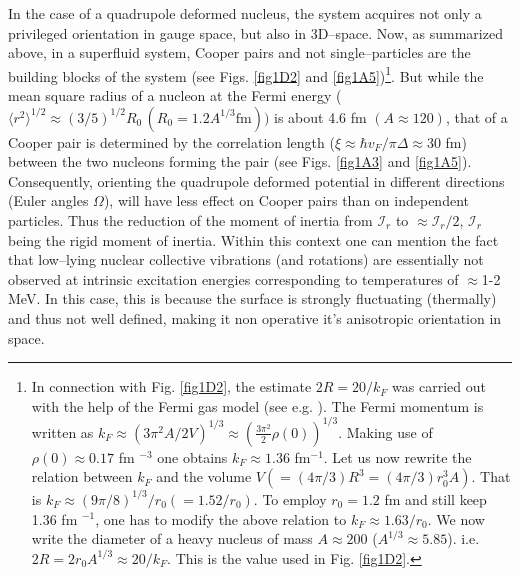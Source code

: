 In the case of a quadrupole deformed nucleus, the system acquires not only a privileged orientation in gauge space, but also in 3D--space. Now, as summarized above, in a superfluid system, Cooper pairs and not single--particles are the building blocks of the system (see Figs. \ref{fig1D2} and \ref{fig1A5})\footnote{In connection with Fig. \ref{fig1D2}, the estimate $2R=20/k_F$ was carried out with the help of the Fermi gas model (see e.g. \cite{Bohr:69}). The Fermi momentum is written as $k_F\approx (3\pi^2 A/2V)^{1/3}\approx (\frac{3\pi^2}{2}\rho(0))^{1/3}$. Making use of $\rho(0)\approx 0.17$ fm $^{-3}$ one obtains $k_F\approx 1.36 $ fm$^{-1}$. Let us now rewrite the relation between $k_F$ and the volume $V(=(4\pi/3) R^3=(4\pi/3) r_0^3 A)$. That is $k_F\approx (9\pi/8)^{1/3}/r_0(=1.52/r_0)$. To employ $r_0=1.2$ fm and still keep 1.36 fm $^{-1}$, one has to modify the above relation to $k_F\approx 1.63/r_0$. We now write the diameter of a heavy nucleus of mass $A\approx 200$ ($A^{1/3}\approx 5.85$). i.e. $2R=2r_0A^{1/3}\approx 20/k_F$.
 This is the value used in Fig. \ref{fig1D2}.}. But while the mean square radius of a nucleon at the Fermi energy ($\langle r^2\rangle^{1/2}\approx (3/5)^{1/2}R_0 \,(R_0=1.2 A^{1/3}\text{fm}))$ is about 4.6 fm $(A\approx 120)$, that of a Cooper pair is determined by the correlation length ($\xi\approx\hbar v_F/\pi\Delta\approx 30$ fm) between the two nucleons forming the pair (see Figs. \ref{fig1A3} and \ref{fig1A5}). Consequently, orienting the quadrupole deformed potential in different directions (Euler angles $\Omega$), will have  less  effect on Cooper pairs than on independent particles. Thus the reduction of the moment of inertia from $\mathcal I_r$ to $\approx\mathcal{I}_r/2$, $\mathcal{I}_r$ being the rigid moment of inertia. Within this context one can mention the fact that low--lying nuclear collective vibrations (and rotations) are essentially not observed at intrinsic excitation energies corresponding to temperatures of $\approx$1-2 MeV. In this case, this is because the surface is strongly fluctuating (thermally) and thus not well defined, making it non operative it's anisotropic orientation in space.
